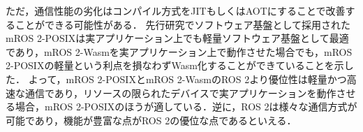 ただ，通信性能の劣化はコンパイル方式をJITもしくはAOTにすることで改善することができる可能性がある．
先行研究でソフトウェア基盤として採用されたmROS 2-POSIXは実アプリケーション上でも軽量ソフトウェア基盤として最適であり，mROS 2-Wasmを実アプリケーション上で動作させた場合でも，mROS 2-POSIXの軽量という利点を損なわずWasm化することができていることを示した．
よって，mROS 2-POSIXとmROS 2-WasmのROS 2より優位性は軽量かつ高速な通信であり，リソースの限られたデバイスで実アプリケーションを動作させる場合，mROS 2-POSIXのほうが適している．逆に，ROS 2は様々な通信方式が可能であり，機能が豊富な点がROS 2の優位な点であるといえる．

